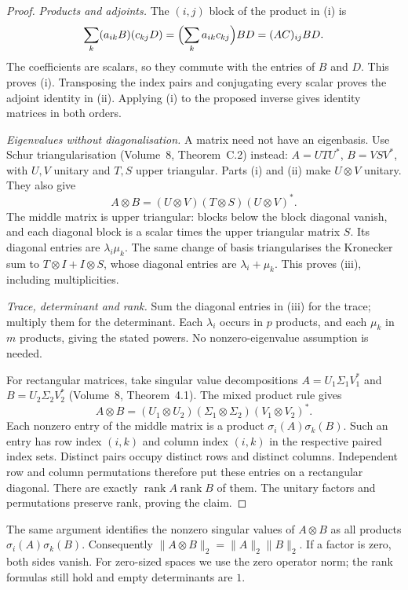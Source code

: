 \begin{proof}
\emph{Products and adjoints.} The $(i,j)$ block of the product in (i) is
\[
\sum_k(a_{ik}B)(c_{kj}D)=\Bigl(\sum_ka_{ik}c_{kj}\Bigr)BD=(AC)_{ij}BD.
\]
The coefficients are scalars, so they commute with the entries of $B$ and $D$. This proves (i). Transposing the index pairs and conjugating every scalar proves the adjoint identity in (ii). Applying (i) to the proposed inverse gives identity matrices in both orders.

\emph{Eigenvalues without diagonalisation.} A matrix need not have an eigenbasis. Use Schur triangularisation (Volume~8, Theorem~C.2) instead: $A=UTU^*$, $B=VSV^*$, with $U,V$ unitary and $T,S$ upper triangular. Parts (i) and (ii) make $U\otimes V$ unitary. They also give
\[
A\otimes B=(U\otimes V)(T\otimes S)(U\otimes V)^*.
\]
The middle matrix is upper triangular: blocks below the block diagonal vanish, and each diagonal block is a scalar times the upper triangular matrix $S$. Its diagonal entries are $\lambda_i\mu_k$. The same change of basis triangularises the Kronecker sum to $T\otimes I+I\otimes S$, whose diagonal entries are $\lambda_i+\mu_k$. This proves (iii), including multiplicities.

\emph{Trace, determinant and rank.} Sum the diagonal entries in (iii) for the trace; multiply them for the determinant. Each $\lambda_i$ occurs in $p$ products, and each $\mu_k$ in $m$ products, giving the stated powers. No nonzero-eigenvalue assumption is needed.

For rectangular matrices, take singular value decompositions $A=U_1\Sigma_1V_1^*$ and $B=U_2\Sigma_2V_2^*$ (Volume~8, Theorem~4.1). The mixed product rule gives
\[
A\otimes B=(U_1\otimes U_2)(\Sigma_1\otimes\Sigma_2)(V_1\otimes V_2)^*.
\]
Each nonzero entry of the middle matrix is a product $\sigma_i(A)\sigma_k(B)$. Such an entry has row index $(i,k)$ and column index $(i,k)$ in the respective paired index sets. Distinct pairs occupy distinct rows and distinct columns. Independent row and column permutations therefore put these entries on a rectangular diagonal. There are exactly $\operatorname{rank}A\operatorname{rank}B$ of them. The unitary factors and permutations preserve rank, proving the claim.
\end{proof}

The same argument identifies the nonzero singular values of $A\otimes B$ as all products $\sigma_i(A)\sigma_k(B)$. Consequently
$\|A\otimes B\|_2=\|A\|_2\|B\|_2$. If a factor is zero, both sides vanish. For zero-sized spaces we use the zero operator norm; the rank formulas still hold and empty determinants are $1$.

